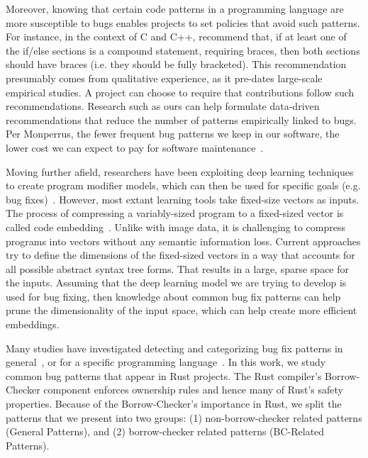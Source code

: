 Moreover, knowing that certain code patterns in a programming language are more susceptible to bugs enables projects to set policies that avoid such patterns. For instance, in the context of C and C++, \cite{Cannon1997RecommendedCS} recommend that, if at least one of the if/else sections is a compound statement, requiring braces, then both sections should have braces (i.e. they should be fully bracketed). This recommendation presumably comes from qualitative experience, as it pre-dates large-scale empirical studies. A project can choose to require that contributions follow such recommendations. Research such as ours can help formulate data-driven recommendations that reduce the number of patterns empirically linked to bugs. Per Monperrus, the fewer frequent bug patterns we keep in our software, the lower cost we can expect to pay for software maintenance~\citep{monperrus2014critical}.

Moving further afield, researchers have been exploiting deep learning techniques to create program modifier models, which can then be used for specific goals (e.g. bug fixes)~\citep{alon2019code2vec,alon2018general,raychev2016learning,bielik2016phog}. However, most extant learning tools take fixed-size vectors as inputs. The process of compressing a variably-sized program to a fixed-sized vector is called code embedding~\citep{chen2019literature}. Unlike with image data, it is challenging to compress programs into vectors without any semantic information loss. Current approaches try to define the dimensions of the fixed-sized vectors in a way that accounts for all possible abstract syntax tree forms. That results in a large, sparse space for the inputs. Assuming that the deep learning model we are trying to develop is used for bug fixing, then knowledge about common bug fix patterns can help prune the dimensionality of the input space, which can help create more efficient embeddings.

Many studies have investigated detecting and categorizing bug fix patterns in general~\citep{islam2021changes,madeiral2018towards,pan2009toward}, or for a specific programming language~\citep{yang2022mining,hanam2016discovering,campos2019discovering}. In this work, we study common bug patterns that appear in Rust projects. The Rust compiler's Borrow-Checker component enforces ownership rules and hence many of Rust's safety properties. Because of the Borrow-Checker's importance in Rust, we split the patterns that we present into two groups: (1) non-borrow-checker related patterns (General Patterns), and (2) borrow-checker related patterns (BC-Related Patterns). \\

